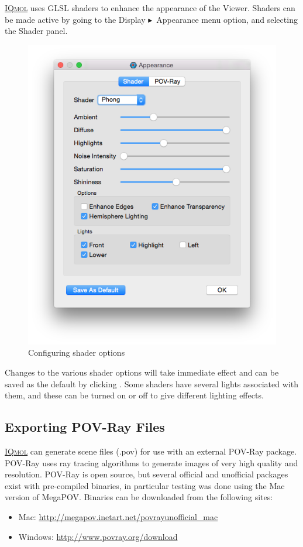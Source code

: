 \documentclass[a4paper,12pt]{article}
\newcommand{\iqmol}{\href{https://www.iqmol.org}{{\scshape IQmol}}}
\newcommand{\bt}{\ensuremath{\blacktriangleright}}
\begin{document}
\iqmol{} uses GLSL shaders to enhance the appearance of the Viewer.  Shaders can
be made active by going to the Display \bt\ Appearance menu option, and selecting
the Shader panel.
\begin{figure}[h]
\begin{center}
\includegraphics[scale=0.20]{figures/ShaderDialog.png}
\caption{Configuring shader options}
\end{center}
\end{figure}

Changes to the various shader options will take immediate effect and can be saved 
as the default by clicking .  Some shaders have several
lights associated with them, and these can be turned on or off to give different
lighting effects.


\subsection{Exporting POV-Ray Files}

\iqmol{} can generate scene files (.pov) for use with an external POV-Ray package.
POV-Ray uses ray tracing algorithms to generate images of very high quality and
resolution.  POV-Ray is open source, but several official and unofficial
packages exist with pre-compiled binaries, in particular testing was done using
the Mac version of MegaPOV.  Binaries can be downloaded from the
following sites:
\begin{itemize}
\itemsep0em
\item Mac: \url{http://megapov.inetart.net/povrayunofficial_mac}
\item Windows: \url{http://www.povray.org/download}
\end{itemize}
\end{document}
